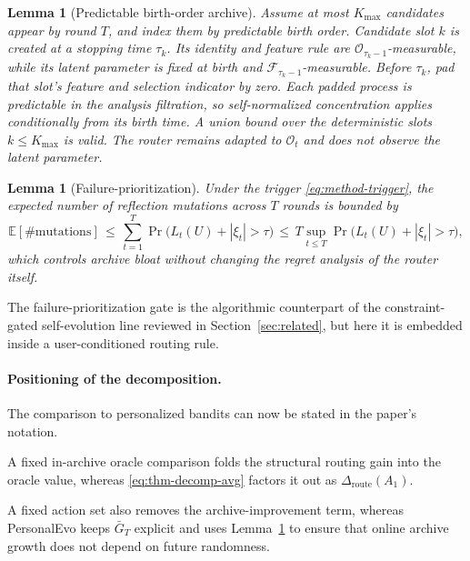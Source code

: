 \documentclass{article} %
\newtheorem{lemma}[theorem]{Lemma}
\providecommand{\E}{\mathbb{E}}
\begin{document}
\begin{lemma}[Predictable birth-order archive]
\label{lem:predictable}
Assume at most $K_{\max}$ candidates appear by round $T$, and index them by predictable birth order. Candidate slot $k$ is created at a stopping time $\tau_k$. Its identity and feature rule are $\mathcal O_{\tau_k-1}$-measurable, while its latent parameter is fixed at birth and $\mathcal F_{\tau_k-1}$-measurable. Before $\tau_k$, pad that slot's feature and selection indicator by zero. Each padded process is predictable in the analysis filtration, so self-normalized concentration applies conditionally from its birth time. A union bound over the deterministic slots $k\le K_{\max}$ is valid. The router remains adapted to \(\mathcal O_t\) and does not observe the latent parameter.
\end{lemma}

\begin{lemma}[Failure-prioritization]
\label{lem:failure}
Under the trigger \eqref{eq:method-trigger}, the expected number of reflection mutations across $T$ rounds is bounded by
\begin{equation}
\label{eq:lem-failure}
\E[\#\mathrm{mutations}]
\,\le\,
\sum_{t=1}^{T}\Pr\bigl(L_t(U)+|\xi_t|>\tau\bigr)
\,\le\,
T\sup_{t\le T}\Pr\bigl(L_t(U)+|\xi_t|>\tau\bigr),
\end{equation}
which controls archive bloat without changing the regret analysis of the router itself.
\end{lemma}

The failure-prioritization gate is the algorithmic counterpart of the constraint-gated self-evolution line reviewed in Section~\ref{sec:related}, but here it is embedded inside a user-conditioned routing rule.

\paragraph{Positioning of the decomposition.}
The comparison to personalized bandits can now be stated in the paper's notation.

A fixed in-archive oracle comparison folds the structural routing gain into the oracle value, whereas \eqref{eq:thm-decomp-avg} factors it out as $\Delta_{\mathrm{route}}(A_1)$.

A fixed action set also removes the archive-improvement term, whereas PersonalEvo keeps $\bar G_T$ explicit and uses Lemma~\ref{lem:predictable} to ensure that online archive growth does not depend on future randomness.
\end{document}
